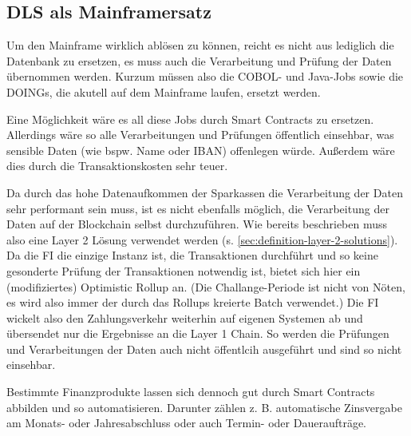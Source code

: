 \subsection{DLS als Mainframersatz}
Um den Mainframe wirklich ablösen zu können, reicht es nicht aus lediglich die Datenbank zu ersetzen, es muss auch die Verarbeitung und Prüfung der Daten übernommen werden.
Kurzum müssen also die COBOL- und Java-Jobs sowie die DOINGs, die akutell auf dem Mainframe laufen, ersetzt werden.

\noindent
Eine Möglichkeit wäre es all diese Jobs durch Smart Contracts zu ersetzen.
Allerdings wäre so alle Verarbeitungen und Prüfungen öffentlich einsehbar, was sensible Daten (wie bspw. Name oder IBAN) offenlegen würde.
Außerdem wäre dies durch die Transaktionskosten sehr teuer.

\noindent
Da durch das hohe Datenaufkommen der Sparkassen die Verarbeitung der Daten sehr performant sein muss, ist es nicht ebenfalls möglich, die Verarbeitung der Daten auf der Blockchain selbst durchzuführen.
Wie bereits beschrieben muss also eine Layer 2 Lösung verwendet werden (s. \ref{sec:definition-layer-2-solutions}).
Da die FI die einzige Instanz ist, die Transaktionen durchführt und so keine gesonderte Prüfung der Transaktionen notwendig ist, bietet sich hier ein (modifiziertes) Optimistic Rollup an. 
(Die Challange-Periode ist nicht von Nöten, es wird also immer der durch das Rollups kreierte Batch verwendet.)
Die FI wickelt also den Zahlungsverkehr weiterhin auf eigenen Systemen ab und übersendet nur die Ergebnisse an die Layer 1 Chain.
So werden die Prüfungen und Verarbeitungen der Daten auch nicht öffentlcih ausgeführt und sind so nicht einsehbar.

\noindent
Bestimmte Finanzprodukte lassen sich dennoch gut durch Smart Contracts abbilden und so automatisieren.
Darunter zählen z. B. automatische Zinsvergabe am Monats- oder Jahresabschluss oder auch Termin- oder Daueraufträge.


